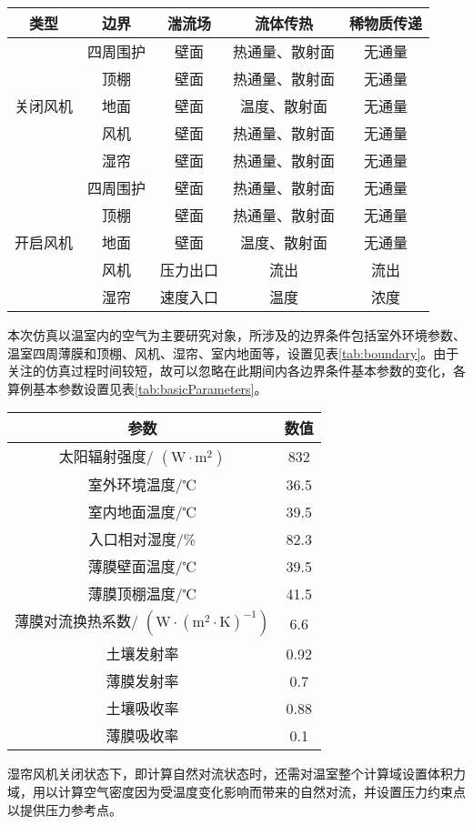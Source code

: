 		\begin{table}[!htbp]
  			\centering
  			\begin{tabular}{ccccc} \toprule
			类型	 & 边界 & 湍流场 & 	流体传热 & 	稀物质传递\\ \midrule
			\multirow{5}{*}{关闭风机} & 四周围护 & 壁面 & 热通量、散射面 & 无通量\\ 
												  & 顶棚  & 壁面 & 热通量、散射面 & 无通量\\
												  & 地面 & 壁面 & 温度、散射面 & 无通量\\
												  & 风机 & 壁面 & 热通量、散射面 & 无通量\\
												  & 湿帘 & 壁面 & 热通量、散射面 & 无通量\\ \midrule
			\multirow{5}{*}{开启风机} & 四周围护 & 壁面 & 热通量、散射面 & 无通量\\
												  & 顶棚 & 壁面	 & 热通量、散射面	 & 无通量\\
												  & 地面 &  壁面 & 温度、散射面	 & 无通量\\
												  & 风机 &  压力出口 & 	流出 & 	流出\\
												  & 湿帘 & 速度入口	 & 温度 & 浓度\\ \bottomrule
 			\end{tabular}
		\end{table}	
本次仿真以温室内的空气为主要研究对象，所涉及的边界条件包括室外环境参数、温室四周薄膜和顶棚、风机、湿帘、室内地面等，设置见表\ref{tab:boundary}。由于关注的仿真过程时间较短，故可以忽略在此期间内各边界条件基本参数的变化，各算例基本参数设置见表\ref{tab:basicParameters}。

		\begin{table}[!htbp]
  			\centering
  			\begin{tabular}{cc} \toprule
			参数 & 数值\\ \midrule
			太阳辐射强度/ $(\text{W} \cdot \text{m}^{2})$ & 	832\\
			室外环境温度/℃	 & 36.5\\
			室内地面温度/℃ & 	39.5\\
			入口相对湿度/\%	 & 82.3\\
			薄膜壁面温度/℃	 & 39.5\\
			薄膜顶棚温度/℃	 & 41.5\\
			薄膜对流换热系数/ $(\text{W} \cdot (\text{m}^{2} \cdot \text{K})^{-1})$ & 6.6\\
			土壤发射率 & 0.92\\
			薄膜发射率 & 0.7\\
			土壤吸收率 & 0.88\\
			薄膜吸收率 & 0.1\\ \bottomrule
 			\end{tabular}
		\end{table}
湿帘风机关闭状态下，即计算自然对流状态时，还需对温室整个计算域设置体积力域，用以计算空气密度因为受温度变化影响而带来的自然对流，并设置压力约束点以提供压力参考点。

